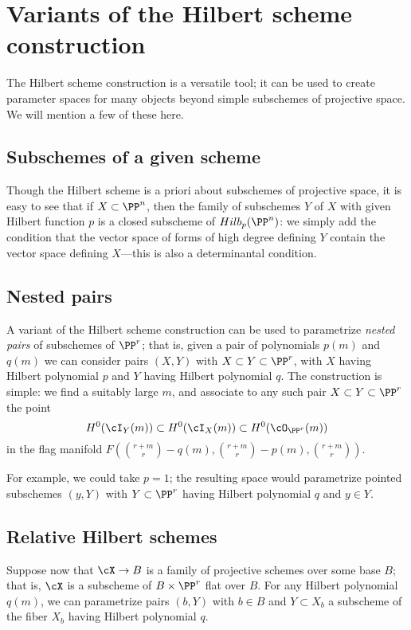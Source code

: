 \section{Variants of the Hilbert scheme construction}

The Hilbert scheme construction is a versatile tool; it can be used to create parameter spaces for many objects beyond simple subschemes of projective space. We will mention a few of these here.

\subsection{Subschemes of a given scheme}

Though the Hilbert scheme is a priori about subschemes of projective space, it is easy to see that if $X\subset \PP^n$,
then the family of subschemes $Y$ of $X$ with given Hilbert function $p$ is a closed subscheme of $Hilb_p(\PP^n)$: we simply
add the condition that the vector space of forms of high degree defining $Y$  contain the vector space defining $X$---this is also a determinantal condition.

\subsection{Nested pairs} A variant of the Hilbert scheme construction can be used to parametrize \emph{nested pairs} of subschemes of $\PP^r$; that is, given a pair of polynomials $p(m)$ and $q(m)$ we can consider pairs $(X,Y)$ with $X \subset Y \subset \PP^r$, with $X$ having Hilbert polynomial $p$ and $Y$ having Hilbert polynomial $q$. The construction is simple: we find a suitably large $m$, and associate to any such pair $X \subset Y \subset \PP^r$ the point
$$
H^0(\cI_Y(m)) \subset H^0(\cI_X(m)) \subset H^0(\cO_{\PP^r}(m))
$$
in the flag manifold $F(\binom{r+m}{r} - q(m), \binom{r+m}{r} - p(m), \binom{r+m}{r})$.

For example, we could take $p=1$; the resulting space would parametrize pointed subschemes $(y,Y)$ with $Y \subset \PP^r$ having Hilbert polynomial $q$ and $y \in Y$.

\subsection{Relative Hilbert schemes} Suppose now that $\cX \to B$ is a family of projective schemes over some base $B$; that is, $\cX$ is a subscheme of $B \times \PP^r$ flat over $B$. For any Hilbert polynomial $q(m)$, we can parametrize pairs $(b, Y)$ with $b \in B$ and $Y \subset X_b$ a subscheme of the fiber $X_b$ having Hilbert polynomial $q$.

